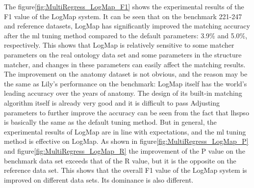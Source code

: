 \documentclass[twoside]{article}
\begin{document}
The figure\ref{fig:MultiRegress_LogMap_F1} shows the experimental results of the F1 value of the LogMap system.
It can be seen that on the benchmark 221-247 and reference datasets, LogMap has significantly improved the matching accuracy after the ml tuning method compared to the default parameters: 3.9\% and 5.0\%, respectively.
This shows that LogMap is relatively sensitive to some matcher parameters on the real ontology data set and some parameters in the structure matcher, and changes in these parameters can easily affect the matching results.
The improvement on the anatomy dataset is not obvious, and the reason may be the same as Lily's performance on the benchmark: LogMap itself has the world's leading accuracy over the years of anatomy. The design of its built-in matching algorithm itself is already very good and it is difficult to pass Adjusting parameters to further improve the accuracy can be seen from the fact that lhspso is basically the same as the default tuning method. But in general, the experimental results of LogMap are in line with expectations, and the ml tuning method is effective on LogMap.
As shown in figure\ref{fig:MultiRegress_LogMap_P} and figure\ref{fig:MultiRegress_LogMap_R} the improvement of the P value on the benchmark data set exceeds that of the R value, but it is the opposite on the reference data set. This shows that the overall F1 value of the LogMap system is improved on different data sets. Its dominance is also different.
\end{document}
